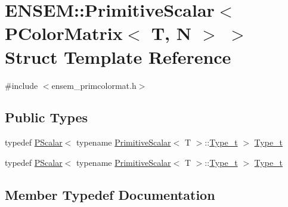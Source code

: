 \hypertarget{structENSEM_1_1PrimitiveScalar_3_01PColorMatrix_3_01T_00_01N_01_4_01_4}{}\section{E\+N\+S\+EM\+:\+:Primitive\+Scalar$<$ P\+Color\+Matrix$<$ T, N $>$ $>$ Struct Template Reference}
\label{structENSEM_1_1PrimitiveScalar_3_01PColorMatrix_3_01T_00_01N_01_4_01_4}


{\ttfamily \#include $<$ensem\+\_\+primcolormat.\+h$>$}

\subsection*{Public Types}
\begin{DoxyCompactItemize}
\item 
typedef \mbox{\hyperlink{classENSEM_1_1PScalar}{P\+Scalar}}$<$ typename \mbox{\hyperlink{structENSEM_1_1PrimitiveScalar}{Primitive\+Scalar}}$<$ T $>$\+::\mbox{\hyperlink{structENSEM_1_1PrimitiveScalar_3_01PColorMatrix_3_01T_00_01N_01_4_01_4_ac43408bdf04ddac58e78326690949cbd}{Type\+\_\+t}} $>$ \mbox{\hyperlink{structENSEM_1_1PrimitiveScalar_3_01PColorMatrix_3_01T_00_01N_01_4_01_4_ac43408bdf04ddac58e78326690949cbd}{Type\+\_\+t}}
\item 
typedef \mbox{\hyperlink{classENSEM_1_1PScalar}{P\+Scalar}}$<$ typename \mbox{\hyperlink{structENSEM_1_1PrimitiveScalar}{Primitive\+Scalar}}$<$ T $>$\+::\mbox{\hyperlink{structENSEM_1_1PrimitiveScalar_3_01PColorMatrix_3_01T_00_01N_01_4_01_4_ac43408bdf04ddac58e78326690949cbd}{Type\+\_\+t}} $>$ \mbox{\hyperlink{structENSEM_1_1PrimitiveScalar_3_01PColorMatrix_3_01T_00_01N_01_4_01_4_ac43408bdf04ddac58e78326690949cbd}{Type\+\_\+t}}
\end{DoxyCompactItemize}


\subsection{Member Typedef Documentation}
\mbox{\label{structENSEM_1_1PrimitiveScalar_3_01PColorMatrix_3_01T_00_01N_01_4_01_4_ac43408bdf04ddac58e78326690949cbd}} 
